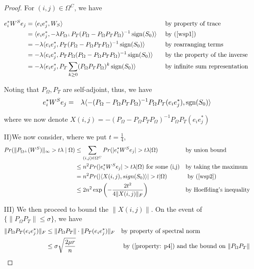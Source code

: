 \begin{proof}
For $(i,j)\in\Omega^{C}$, we have

\[
\begin{aligned}
e_{i}^{*}W^{S}e_{j} 
& = \langle e_{i}e_{j}^{*},W_{S} \rangle
&&\text{ by property of trace}\\
& = \langle e_{i}e_{j}^{*},-\lambda P_{\Omega^{\bot}}P_{T}(P_{\Omega}-P_{\Omega}P_{T}P_{\Omega})^{-1} \operatorname{sign}(S_{0}) \rangle
&&\text{ by (\ref{wsp1})}\\
& = -\lambda \langle e_{i}e_{j}^{*},P_{T}(P_{\Omega}-P_{\Omega}P_{T}P_{\Omega})^{-1} \operatorname{sign}(S_{0}) \rangle
&&\text{ by rearranging terms}\\
& = -\lambda \langle e_{i}e_{j}^{*},P_{T}P_{\Omega}(P_{\Omega}-P_{\Omega}P_{T}P_{\Omega})^{-1} \operatorname{sign}(S_{0}) \rangle
&&\text{ by the property of the inverse }\\
& = -\lambda \langle e_{i}e_{j}^{*},P_{T}\sum_{k\ge0}(P_{\Omega}P_{T}P_{\Omega})^{k} \operatorname{sign}(S_{0}) \rangle 
&&\text{ by infinite sum representation}
\end{aligned}
\]

Noting that $P_{\Omega},P_{T}$ are self-adjoint, thus, we have
\begin{eqnarray}
e_{i}^{*}W^{S}e_{j} & = & \lambda \langle-(P_{\Omega}-P_{\Omega}P_{T}P_{\Omega})^{-1}P_{\Omega}P_{T}(e_{i}e_{j}^{*}), \text{sgn}(S_{0}) \rangle
\label{wsp2}
\end{eqnarray}


where we now denote $X(i,j)=-(P_{\Omega}-P_{\Omega}P_{T}P_{\Omega})^{-1}P_{\Omega}P_{T}(e_{i}e_{j}^{*})$

II)We now consider, where we put $t=\frac{1}{4}$,
\[
\begin{aligned}
Pr(\|P_{\Omega^{\bot}}(W^{S})\|_{\infty}>t\lambda\mid\Omega) 
& \le \sum_{(i,j)\in\Omega^{C}}Pr(|e_{i}^{*}W^{S}e_{j}|>t\lambda|\Omega) 
&&\text{by union bound}\\
& \le n^{2}Pr(|e_{i}^{*}W^{S}e_{j}|>t\lambda|\Omega)\text{ for some (i,j)} 
&&\text{by taking the maximum}\\
& = n^{2}Pr(| \langle X(i,j),sign(S_{0}) \rangle|>t|\Omega) 
&&\text{ by (\ref{wsp2})}\\
& \le 2n^{2}\exp \left( -\frac{2t^{2}}{4\|X(i,j)\|_{F}} \right)
&&\text{by Hoeffding's inequality}
\end{aligned}
\]

III) We then proceed to bound the $\|X(i,j)\|$. On the event of $\{\|P_{\Omega}P_{T}\|\le\sigma\}$,
we have
\[
\begin{aligned}
\|P_{\Omega}P_{T}(e_{i}e_{j}^{*})\|_{F} 
& \le \|P_{\Omega}P_{T}\|\cdot\|P_{T}(e_{i}e_{j}^{*})\|_{F} 
&&\text{by property of spectral norm}\\
& \le \sigma\sqrt{\frac{2\mu r}{n}} 
&&\text{ by (\ref{property: p4}) and the bound on } \|P_{\Omega}P_{T}\|
\end{aligned}
\]



\end{proof}
